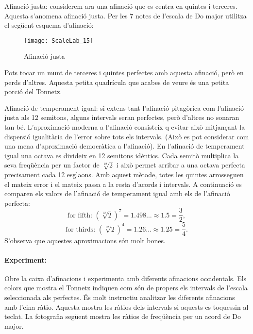 Afinació justa: considerem ara una afinació que es centra en quintes i terceres. Aquesta s'anomena afinació justa. Per les 7 notes de l'escala de Do major utilitza el següent esquema d'afinació:

\begin{figure}[h]
\centering
\texttt{[image: ScaleLab\_15]}
\caption*{Afinació justa}
\end{figure}

Pots tocar un munt de terceres i quintes perfectes amb aquesta afinació, però en perds d'altres. Aquesta petita quadrícula que acabes de veure és una petita porció del Tonnetz.


Afinació de temperament igual: si extens tant l'afinació pitagòrica com l'afinació justa als 12 semitons, alguns intervals seran perfectes, però d'altres no sonaran tan bé. L'aproximació moderna a l'afinació consisteix q evitar això mitjançant la dispersió igualitària de l'error sobre tots els intervals. (Això es pot considerar com una mena d'aproximació democràtica a l'afinació). En l'afinació de temperament igual una octava es divideix en 12 semitons idèntics. Cada semitò multiplica la seva freqüència per un factor de $\sqrt[12]{2}$ i això permet arribar a una octava perfecta precisament cada 12 esglaons. Amb aquest mètode, totes les quintes arrosseguen el mateix error i el mateix passa a la resta d'acords i intervals. A continuació es comparen els valors de l'afinació de temperament igual amb els de l'afinació perfecta:
$$\textrm{for fifth: } (\sqrt[12]{2})^7 = 1.498\ldots \approx 1.5 = \frac{3}{2} ,$$
$$\textrm{for thirds: } (\sqrt[12]{2})^4 = 1.26\ldots \approx 1.25 = \frac{5}{4} .$$
S'observa que aquestes aproximacions són molt bones.

\paragraph{Experiment:}
Obre la caixa d'afinacions i experimenta amb diferents afinacions occidentals. Els colors que mostra el Tonnetz indiquen com són de propers els intervals de l'escala seleccionada als perfectes. És molt instructiu analitzar les diferents afinacions amb l'eina ràtio. Aquesta mostra les ràtios dels intervals si aquests es toquessin al teclat. La fotografia següent mostra les ràtios de freqüència per un acord de Do major.

\begin{figure}[h]
\centering
{}
\end{figure}

